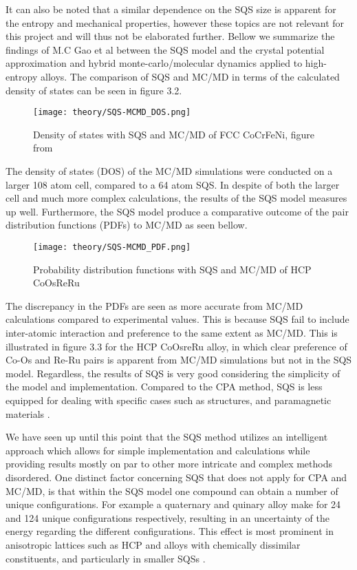 It can also be noted that a similar dependence on the SQS size is apparent for the entropy and mechanical properties, however these topics are not relevant for this project and will thus not be elaborated further. Bellow we summarize the findings of M.C Gao et al between the SQS model and the crystal potential approximation and hybrid monte-carlo/molecular dynamics applied to high-entropy alloys. The comparison of SQS and MC/MD in terms of the calculated density of states can be seen in figure 3.2.
      
\begin{figure}[H]
\centering
\texttt{[image: theory/SQS-MCMD\_DOS.png]}
\caption{Density of states with SQS and MC/MD of FCC CoCrFeNi, figure from \cite{hea2016_ch10}}
\end{figure}

The density of states (DOS) of the MC/MD simulations were conducted on a larger 108 atom cell, compared to a 64 atom SQS. In despite of both the larger cell and much more complex calculations, the results of the SQS model measures up well. Furthermore, the SQS model produce a comparative outcome of the pair distribution functions (PDFs) to MC/MD as seen bellow. 

\begin{figure}[H]
\centering
\texttt{[image: theory/SQS-MCMD\_PDF.png]}
\caption{Probability distribution functions with SQS and MC/MD of HCP CoOsReRu \cite{hea2016_ch10}}
\end{figure}

The discrepancy in the PDFs are seen as more accurate from MC/MD calculations compared to experimental values. This is because SQS fail to include inter-atomic interaction and preference to the same extent as MC/MD. This is illustrated in figure 3.3 for the HCP CoOsreRu alloy, in which clear preference of Co-Os and Re-Ru pairs is apparent from MC/MD simulations but not in the SQS model. Regardless, the results of SQS is very good considering the simplicity of the model and implementation. Compared to the CPA method, SQS is less equipped for dealing with specific cases such as  structures, and paramagnetic materials \cite{hea2016_ch10}. 

We have seen up until this point that the SQS method utilizes an intelligent approach which allows for simple implementation and calculations while providing results mostly on par to other more intricate and complex methods disordered. One distinct factor concerning SQS that does not apply for CPA and MC/MD, is that within the SQS model one compound can obtain a number of unique configurations. For example a quaternary and quinary alloy make for 24 and 124 unique configurations respectively, resulting in an uncertainty of the energy regarding the different configurations. This effect is most prominent in anisotropic lattices such as HCP and alloys with chemically dissimilar constituents, and particularly in smaller SQSs \cite{hea2016_ch10}. 
 
